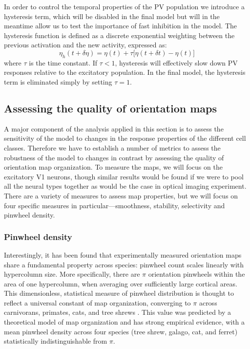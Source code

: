 In order to control the temporal properties of the PV population we
introduce a hysteresis term, which will be disabled in the final
model but will in the meantime allow us to test the importance of fast
inhibition in the model. The hysteresis function is defined as a discrete
exponential weighting between the previous activation and the new
activity, expressed as:
\begin{equation}
  \eta_h (t + \delta\eta) = \eta(t) + \tau \big[ \eta(t+\delta t) - \eta(t) \big]
\end{equation}
where $\tau$ is the time constant. If $\tau < 1$, hysteresis will
effectively slow down PV responses relative to the excitatory
population. In the final model, the hysteresis term is eliminated simply by
setting $\tau = 1$.

\subsection{Assessing the quality of orientation maps} \label{metrics}

A major component of the analysis applied in this section is to assess
the sensitivity of the model to changes in the response properties of
the different cell classes. Therefore we have to establish a number of
metrics to assess the robustness of the model to changes in contrast
by assessing the quality of orientation map organization.  To measure
the maps, we will focus on the excitatory V1 neurons, though similar
results would be found if we were to pool all the neural types
together as would be the case in optical imaging experiment.  There
are a variety of measures to assess map properties, but we will focus
on four specific measures in particular---smoothness, stability,
selectivity and pinwheel density.

\subsubsection*{Pinwheel density}

Interestingly, it has been found that experimentally measured
orientation maps share a fundamental property across species: pinwheel
count scales linearly with hypercolumn size.  More specifically, there
are $\pi$ orientation pinwheels within the area of one hypercolumn,
when averaging over sufficiently large cortical areas. This
dimensionless, statistical measure of pinwheel distribution is thought
to reflect a universal constant of map organization, converging to
$\pi$ across carnivorans, primates, cats, and tree shrews
\citep{Kaschube2010, Keil2012}. This value was predicted by a
theoretical model of map organization and has strong empirical
evidence, with a mean pinwheel density across four species (tree
shrew, galago, cat, and ferret) statistically indistinguishable from
$\pi$.

